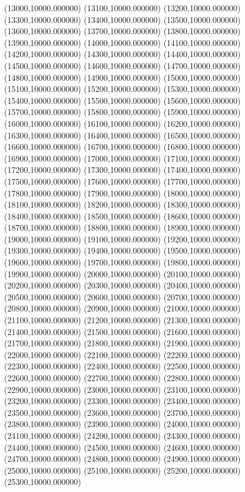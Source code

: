 (13000,10000.000000)
(13100,10000.000000)
(13200,10000.000000)
(13300,10000.000000)
(13400,10000.000000)
(13500,10000.000000)
(13600,10000.000000)
(13700,10000.000000)
(13800,10000.000000)
(13900,10000.000000)
(14000,10000.000000)
(14100,10000.000000)
(14200,10000.000000)
(14300,10000.000000)
(14400,10000.000000)
(14500,10000.000000)
(14600,10000.000000)
(14700,10000.000000)
(14800,10000.000000)
(14900,10000.000000)
(15000,10000.000000)
(15100,10000.000000)
(15200,10000.000000)
(15300,10000.000000)
(15400,10000.000000)
(15500,10000.000000)
(15600,10000.000000)
(15700,10000.000000)
(15800,10000.000000)
(15900,10000.000000)
(16000,10000.000000)
(16100,10000.000000)
(16200,10000.000000)
(16300,10000.000000)
(16400,10000.000000)
(16500,10000.000000)
(16600,10000.000000)
(16700,10000.000000)
(16800,10000.000000)
(16900,10000.000000)
(17000,10000.000000)
(17100,10000.000000)
(17200,10000.000000)
(17300,10000.000000)
(17400,10000.000000)
(17500,10000.000000)
(17600,10000.000000)
(17700,10000.000000)
(17800,10000.000000)
(17900,10000.000000)
(18000,10000.000000)
(18100,10000.000000)
(18200,10000.000000)
(18300,10000.000000)
(18400,10000.000000)
(18500,10000.000000)
(18600,10000.000000)
(18700,10000.000000)
(18800,10000.000000)
(18900,10000.000000)
(19000,10000.000000)
(19100,10000.000000)
(19200,10000.000000)
(19300,10000.000000)
(19400,10000.000000)
(19500,10000.000000)
(19600,10000.000000)
(19700,10000.000000)
(19800,10000.000000)
(19900,10000.000000)
(20000,10000.000000)
(20100,10000.000000)
(20200,10000.000000)
(20300,10000.000000)
(20400,10000.000000)
(20500,10000.000000)
(20600,10000.000000)
(20700,10000.000000)
(20800,10000.000000)
(20900,10000.000000)
(21000,10000.000000)
(21100,10000.000000)
(21200,10000.000000)
(21300,10000.000000)
(21400,10000.000000)
(21500,10000.000000)
(21600,10000.000000)
(21700,10000.000000)
(21800,10000.000000)
(21900,10000.000000)
(22000,10000.000000)
(22100,10000.000000)
(22200,10000.000000)
(22300,10000.000000)
(22400,10000.000000)
(22500,10000.000000)
(22600,10000.000000)
(22700,10000.000000)
(22800,10000.000000)
(22900,10000.000000)
(23000,10000.000000)
(23100,10000.000000)
(23200,10000.000000)
(23300,10000.000000)
(23400,10000.000000)
(23500,10000.000000)
(23600,10000.000000)
(23700,10000.000000)
(23800,10000.000000)
(23900,10000.000000)
(24000,10000.000000)
(24100,10000.000000)
(24200,10000.000000)
(24300,10000.000000)
(24400,10000.000000)
(24500,10000.000000)
(24600,10000.000000)
(24700,10000.000000)
(24800,10000.000000)
(24900,10000.000000)
(25000,10000.000000)
(25100,10000.000000)
(25200,10000.000000)
(25300,10000.000000)

